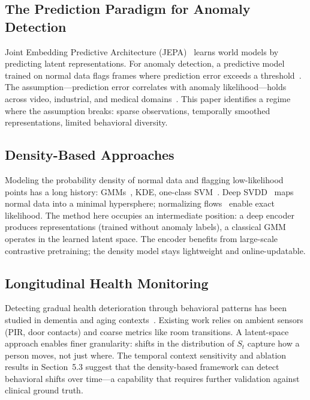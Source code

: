 \documentclass[11pt,a4paper]{article}
\begin{document}
\subsection{The Prediction Paradigm for Anomaly Detection}

Joint Embedding Predictive Architecture (JEPA)~\cite{lecun2022path} learns world models by predicting latent representations.
For anomaly detection, a predictive model trained on normal data flags frames where prediction error exceeds a threshold~\cite{liu2018future,nguyen2021autoencoder}.
The assumption---prediction error correlates with anomaly likelihood---holds across video, industrial, and medical domains~\cite{su2022anomaly,baur2021autoencoder}.
This paper identifies a regime where the assumption breaks: sparse observations, temporally smoothed representations, limited behavioral diversity.

\subsection{Density-Based Approaches}

Modeling the probability density of normal data and flagging low-likelihood points has a long history: GMMs~\cite{bishop2006pattern}, KDE, one-class SVM~\cite{scholkopf2001oneclass}.
Deep SVDD~\cite{ruff2018deep} maps normal data into a minimal hypersphere; normalizing flows~\cite{rezende2015normalizing} enable exact likelihood.
The method here occupies an intermediate position: a deep encoder produces representations (trained without anomaly labels), a classical GMM operates in the learned latent space.
The encoder benefits from large-scale contrastive pretraining; the density model stays lightweight and online-updatable.

\subsection{Longitudinal Health Monitoring}

Detecting gradual health deterioration through behavioral patterns has been studied in dementia and aging contexts~\cite{kaye2011intelligent,alberdi2016smart}.
Existing work relies on ambient sensors (PIR, door contacts) and coarse metrics like room transitions.
A latent-space approach enables finer granularity: shifts in the distribution of $S_t$ capture how a person moves, not just where.
The temporal context sensitivity and ablation results in Section~5.3 suggest that the density-based framework can detect behavioral shifts over time---a capability that requires further validation against clinical ground truth.
\end{document}
